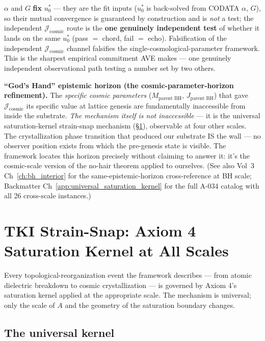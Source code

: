 $\alpha$ and $G$ \textbf{fix} $u_0^*$ --- they
are the fit inputs ($u_0^*$ is back-solved from CODATA $\alpha$, $G$), so their
mutual convergence is guaranteed by construction and is \emph{not} a test; the
independent $\mathcal{J}_{\text{cosmic}}$ route is the \textbf{one genuinely
independent test} of whether it lands on the same $u_0^*$ (pass $=$ chord, fail
$=$ echo). Falsification of the independent $\mathcal{J}_{\text{cosmic}}$ channel
falsifies the single-cosmological-parameter framework. This is the sharpest
empirical commitment AVE makes --- one genuinely independent observational path
testing a number set by two others.

\textbf{``God's Hand'' epistemic horizon (the cosmic-parameter-horizon refinement).}
The \emph{specific cosmic parameters} ($M_{\text{parent BH}}$, $J_{\text{parent BH}}$)
that gave $\mathcal{J}_{\text{cosmic}}$ its specific value at lattice genesis are
fundamentally inaccessible from inside the substrate. \emph{The mechanism itself
is not inaccessible} --- it is the universal saturation-kernel strain-snap
mechanism (\S\ref{sec:tki_strain_snap}), observable at four other scales. The
crystallization phase transition that produced our substrate IS the wall ---
no observer position exists from which the pre-genesis state is visible. The
framework locates this horizon precisely without claiming to answer it: it's
the cosmic-scale version of the no-hair theorem applied to ourselves. (See
also Vol~3 Ch~\ref{ch:bh_interior} for the same-epistemic-horizon
cross-reference at BH scale; Backmatter Ch~\ref{app:universal_saturation_kernel}
for the full A-034 catalog with all 26 cross-scale instances.)

\section{TKI Strain-Snap: Axiom 4 Saturation Kernel at All Scales}
\label{sec:tki_strain_snap}

Every topological-reorganization event the framework describes --- from
atomic dielectric breakdown to cosmic crystallization --- is governed by
Axiom 4's saturation kernel applied at the appropriate scale. The mechanism
is universal; only the scale of $A$ and the geometry of the saturation
boundary changes.

\subsection{The universal kernel}

